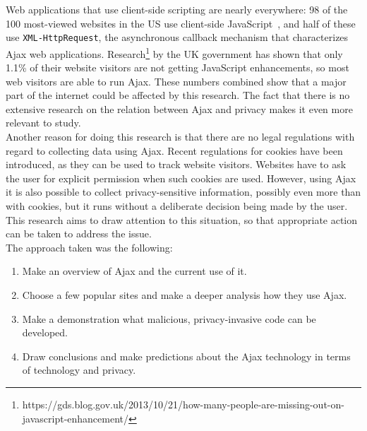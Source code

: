 Web applications that use client-side scripting are nearly everywhere: 98 of the 100 most-viewed websites in the US use client-side JavaScript~\cite{intrusion}, and half of these use \verb|XML-HttpRequest|, the asynchronous callback mechanism that characterizes Ajax web applications. Research\footnote{https://gds.blog.gov.uk/2013/10/21/how-many-people-are-missing-out-on-javascript-enhancement/} by the UK government has shown that only 1.1\% of their website visitors are not getting JavaScript enhancements, so most web visitors are able to run Ajax. These numbers combined show that a major part of the internet could be affected by this research. The fact that there is no extensive research on the relation between Ajax and privacy makes it even more relevant to study.\\

Another reason for doing this research is that there are no legal regulations with regard to collecting data using Ajax. Recent regulations for cookies have been introduced, as they can be used to track website visitors. Websites have to ask the user for explicit permission when such cookies are used. However, using Ajax it is also possible to collect privacy-sensitive information, possibly even more than with cookies, but it runs without a deliberate decision being made by the user. This research aims to draw attention to this situation, so that appropriate action can be taken to address the issue.\\
	
The approach taken was the following:\\
\begin{enumerate}
	\item Make an overview of Ajax and the current use of it.
	\item Choose a few popular sites and make a deeper analysis how they use Ajax.
	\item Make a demonstration what malicious, privacy-invasive code can be developed.
	\item Draw conclusions and make predictions about the Ajax technology in terms of technology and privacy.
\end{enumerate}

